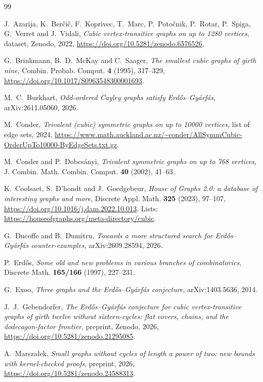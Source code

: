 \documentclass[11pt]{amsart}
\theoremstyle{remark}
\begin{document}
\begin{thebibliography}{99}

J.~Azarija, K.~Berčič, F.~Koprivec, T.~Marc, P.~Potočnik, P.~Rotar, P.~Spiga,
G.~Verret and J.~Vidali, \emph{Cubic vertex-transitive graphs on up to 1280
vertices}, dataset, Zenodo, 2022, \url{https://doi.org/10.5281/zenodo.6576526}.

G.~Brinkmann, B.~D.~McKay and C.~Saager, \emph{The smallest cubic graphs of
girth nine}, Combin. Probab. Comput. \textbf{4} (1995), 317--329,
\url{https://doi.org/10.1017/S0963548300001693}.

M.~C.~Burkhart, \emph{Odd-ordered Cayley graphs satisfy Erdős--Gyárfás},
arXiv:2611.05060, 2026.

M.~Conder, \emph{Trivalent (cubic) symmetric graphs on up to 10000 vertices},
list of edge sets, 2024,
\url{https://www.math.auckland.ac.nz/~conder/AllSymmCubic-OrderUpTo10000-ByEdgeSets.txt.gz}.

M.~Conder and P.~Dobcsányi, \emph{Trivalent symmetric graphs on up to 768
vertices}, J. Combin. Math. Combin. Comput. \textbf{40} (2002), 41--63.

K.~Coolsaet, S.~D'hondt and J.~Goedgebeur, \emph{House of Graphs 2.0: a
database of interesting graphs and more}, Discrete Appl. Math. \textbf{325}
(2023), 97--107, \url{https://doi.org/10.1016/j.dam.2022.10.013}. Lists:
\url{https://houseofgraphs.org/meta-directory/cubic}.

G.~Ducoffe and B.~Dumitru, \emph{Towards a more structured search for
Erdős--Gyárfás counter-examples}, arXiv:2609.28594, 2026.

P.~Erdős, \emph{Some old and new problems in various branches of combinatorics},
Discrete Math. \textbf{165/166} (1997), 227--231.

G.~Exoo, \emph{Three graphs and the Erdős--Gyárfás conjecture},
arXiv:1403.5636, 2014.

J.~J.~Gebendorfer, \emph{The Erdős--Gyárfás conjecture for cubic
vertex-transitive graphs of girth twelve without sixteen-cycles: flat covers,
chains, and the dodecagon-factor frontier}, preprint, Zenodo, 2026,
\url{https://doi.org/10.5281/zenodo.21295085}.

A.~Marszałek, \emph{Small graphs without cycles of length a power of two: new
bounds with kernel-checked proofs}, preprint, 2026,
\url{https://doi.org/10.5281/zenodo.24588313}.


\end{thebibliography}
\end{document}
